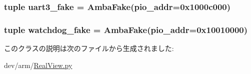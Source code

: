 \label{classRealView_1_1RealViewEB_a0c7e8be915fc7946adb67f2522bf26b1}
\hypertarget{classRealView_1_1RealViewEB_ac8f4703047b3e05e27410c2c79b2f043}{
\subsubsection[{uart3\_\-fake}]{\setlength{\rightskip}{0pt plus 5cm}tuple {\bf uart3\_\-fake} = {\bf AmbaFake}(pio\_\-addr=0x1000c000)}}
\label{classRealView_1_1RealViewEB_ac8f4703047b3e05e27410c2c79b2f043}
\hypertarget{classRealView_1_1RealViewEB_a6dfafd229651b87c734e8433a613a8a4}{
\subsubsection[{watchdog\_\-fake}]{\setlength{\rightskip}{0pt plus 5cm}tuple {\bf watchdog\_\-fake} = {\bf AmbaFake}(pio\_\-addr=0x10010000)}}
\label{classRealView_1_1RealViewEB_a6dfafd229651b87c734e8433a613a8a4}


このクラスの説明は次のファイルから生成されました:\begin{DoxyCompactItemize}
\item 
dev/arm/\hyperlink{RealView_8py}{RealView.py}\end{DoxyCompactItemize}

